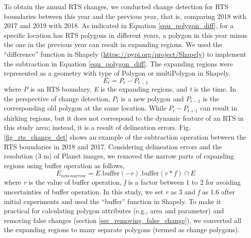 \documentclass[authoryear,preprint,review,12pt]{elsarticle}
\begin{document}
To obtain the annual RTS changes, we conducted change detection for RTS boundaries between this year and the previous year, that is, comparing 2018 with 2017 and 2019 with 2018. 
 As indicated in Equation \ref{equ_polygon_diff}, for a specific location has RTS polygons in different years, a polygon in this year minus the one in the previous year can result in expanding regions. 
We used the ``difference'' function in Shapely (\url{https://pypi.org/project/Shapely}) to implement the subtraction in Equation \ref{equ_polygon_diff}. 
The expanding regions were represented as a geometry with type of Polygon or multiPolygon in Shapely.
\begin{equation}
E_{t}= P_{t} - P_{t-1}
\label{equ_polygon_diff}
\end{equation}
where \emph{P} is an RTS boundary, \emph{E} is the expanding regions, and \emph{t} is the time. 
In the perspective of change detection, $P_{t}$ is a new polygon and $P_{t-1}$ is the corresponding old polygon at the same location. 
While $P_{t} - P_{t+1}$ can result in shirking regions, but it does not correspond to the dynamic feature of an RTS in this study area; instead, it is a result of delineation errors. 
Fig. \ref{fig_rts_change_det} shows an example of the subtraction operation between the RTS boundaries in 2018 and 2017. 
Considering delineation errors and the resolution (3 m) of Planet images, we removed the narrow parts of expanding regions using buffer operation as follows, 
\begin{equation}
E_{non\text{-}narrow}= E.\text{buffer}(-r).\text{buffer}(r*f) \cap E
\label{equ_polygon_buffer}
\end{equation}
where \emph{r} is the value of buffer operation,  \emph{f} is a factor between 1 to 2 for avoiding uncertainties of buffer operation. 
In this study, we set \emph{r} as 3 and \emph{f} as 1.6 after initial experiments and used the ``buffer'' function in Shapely.
To make it practical for calculating polygon attributes (e.g., area and parameter) and removing false changes (section \ref{sec_removing_false_change}), we converted all the expanding regions to many separate polygons (termed as change polygons).



\end{document}
